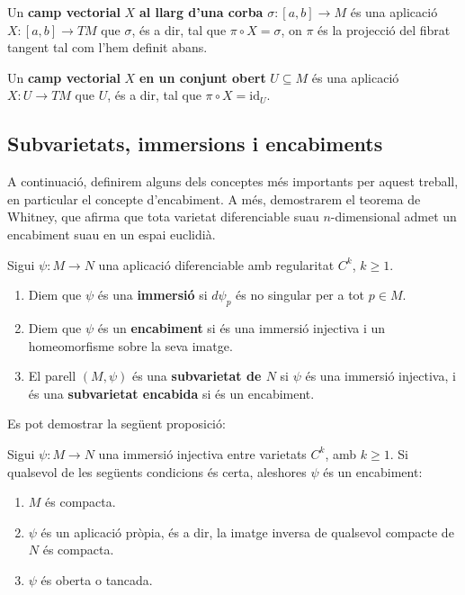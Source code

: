 \begin{defi}
    Un \textbf{camp vectorial} $X$ \textbf{al llarg d'una corba} $\sigma:[a,b]\to M$ és una aplicació $X:[a,b]\to TM$ que  $\sigma$, és a dir, tal que $\pi\circ X = \sigma$, on $\pi$ és la projecció del fibrat tangent tal com l'hem definit abans. 

    Un \textbf{camp vectorial} $X$ \textbf{en un conjunt obert} $U\subseteq M$ és una aplicació $X:U\to TM$ que  $U$, és a dir, tal que $\pi\circ X = \text{id}_U$.
\end{defi}


\subsection{Subvarietats, immersions i encabiments}
A continuació, definirem alguns dels conceptes més importants per aquest treball, en particular el concepte d'encabiment. A més, demostrarem el teorema de Whitney, que afirma que tota varietat diferenciable suau $n$-dimensional admet un encabiment suau en un espai euclidià. 
\begin{defi}
    Sigui $\psi:M\to N$ una aplicació diferenciable amb regularitat $C^k$, $k\ge 1$.
    \begin{enumerate}
        \item Diem que $\psi$ és una \textbf{immersió} si $d\psi_p$ és no singular per a tot $p\in M$.
        \item Diem que $\psi$ és un \textbf{encabiment} si és una immersió injectiva i un homeomorfisme sobre la seva imatge.
        \item El parell $(M, \psi)$ és una \textbf{subvarietat de $N$} si $\psi$ és una immersió injectiva, i és una \textbf{subvarietat encabida} si és un encabiment.
    \end{enumerate}
\end{defi}

Es pot demostrar la següent proposició:
\begin{prop}\label{prop:encabiment_immersio}
    Sigui $\psi:M\to N$ una immersió injectiva entre varietats $C^k$, amb $k\ge 1$. Si qualsevol de les següents condicions és certa, aleshores $\psi$ és un encabiment:
    \begin{enumerate}
        \item $M$ és compacta.
        \item $\psi$ és un aplicació pròpia, és a dir, la imatge inversa de qualsevol compacte de $N$ és compacta.
        \item $\psi$ és oberta o tancada.
    \end{enumerate}
\end{prop}

